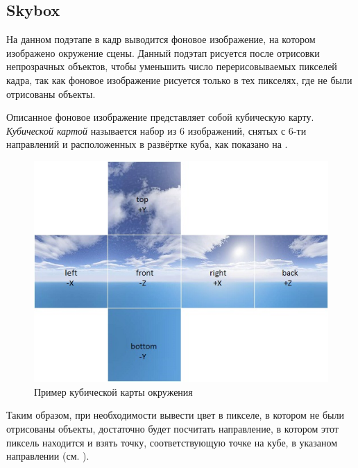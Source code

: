 	\subsection{Skybox} \label{ch3:render_pass:skybox}
		На данном подэтапе в кадр выводится фоновое изображение, на котором изображено окружение сцены. Данный подэтап рисуется после отрисовки непрозрачных объектов, чтобы уменьшить число перерисовываемых пикселей кадра, так как фоновое изображение рисуется только в тех пикселях, где не были отрисованы объекты. 
		
		Описанное фоновое изображение представляет собой кубическую карту. \textit{Кубической картой} называется набор из 6 изображений, снятых с 6-ти направлений и расположенных в развёртке куба, как показано на .
		
		\begin{figure}[ht!] 
			\center
			\includegraphics [scale=0.8] {my_folder/images//skybox}	
			\caption{Пример кубической карты окружения} 
			\label{fig:skybox}
		\end{figure}
		
		Таким образом, при необходимости вывести цвет в пикселе, в котором не были отрисованы объекты, достаточно будет посчитать направление, в котором этот пиксель находится и взять точку, соответствующую точке на кубе, в указаном направлении (см. ).
		
